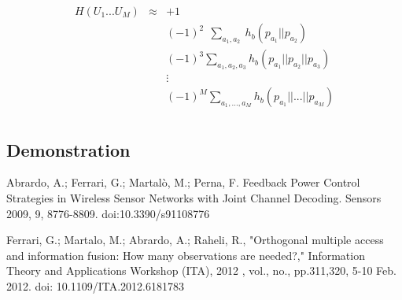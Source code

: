 \documentclass[a4paper,10pt]{article}
\begin{document}
\begin{equation}
\begin{matrix}
H(U_1 ... U_M) & \approx & +1\\
~              & ~       & (-1)^{2}~~\sum \limits_{a_1,a_2}    ~h_b(p_{a_1}||p_{a_2})~~~~~~~\\
~              & ~       & (-1)^{3}\sum \limits_{a_1,a_2,a_3} h_b(p_{a_1}||p_{a_2}||p_{a_3})\\
~              & ~       & \vdots\\
~              & ~       & (-1)^{M}\sum \limits_{a_1, ...,a_M} h_b(p_{a_1}||...||p_{a_M})\\


\end{matrix}
\end{equation}

\subsection{Demonstration}

 \begin{thebibliography}{99}
Abrardo, A.; Ferrari, G.; Martalò, M.; Perna, F. Feedback Power Control Strategies in 
Wireless Sensor Networks with Joint Channel Decoding. Sensors 2009, 9, 8776-8809.
doi:10.3390/s91108776
 
Ferrari, G.; Martalo, M.; Abrardo, A.; Raheli, R., "Orthogonal multiple access 
and information fusion: How many observations are needed?," Information Theory and 
Applications Workshop (ITA), 2012 , vol., no., pp.311,320, 5-10 Feb. 2012.
doi: 10.1109/ITA.2012.6181783
 
 \end{thebibliography} 
\end{document}
